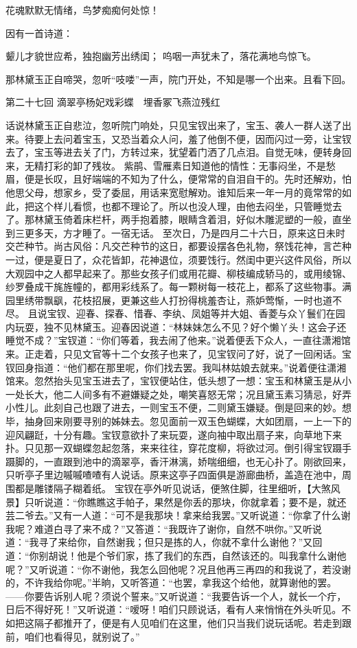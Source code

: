 \documentclass[12pt,oneside]{book}
\begin{document}
花魂默默无情绪，鸟梦痴痴何处惊！

因有一首诗道：

颦儿才貌世应希，独抱幽芳出绣闺；
呜咽一声犹未了，落花满地鸟惊飞。

那林黛玉正自啼哭，忽听“吱喽”一声，院门开处，不知是哪一个出来。且看下回。




 
第二十七回  滴翠亭杨妃戏彩蝶　埋香冢飞燕泣残红


话说林黛玉正自悲泣，忽听院门响处，只见宝钗出来了，宝玉、袭人一群人送了出来。待要上去问着宝玉，又恐当着众人问，羞了他倒不便，因而闪过一旁，让宝钗去了，宝玉等进去关了门，方转过来，犹望着门洒了几点泪。自觉无味，便转身回来，无精打彩的卸了残妆。
紫鹃、雪雁素日知道他的情性：无事闷坐，不是愁眉，便是长叹，且好端端的不知为了什么，便常常的自泪自干的。先时还解劝，怕他思父母，想家乡，受了委屈，用话来宽慰解劝。谁知后来一年一月的竟常常的如此，把这个样儿看惯，也都不理论了。所以也没人理，由他去闷坐，只管睡觉去了。那林黛玉倚着床栏杆，两手抱着膝，眼睛含着泪，好似木雕泥塑的一般，直坐到三更多天，方才睡了。一宿无话。
至次日，乃是四月二十六日，原来这日未时交芒种节。尚古风俗：凡交芒种节的这日，都要设摆各色礼物，祭饯花神，言芒种一过，便是夏日了，众花皆卸，花神退位，须要饯行。然闺中更兴这件风俗，所以大观园中之人都早起来了。那些女孩子们或用花瓣、柳枝编成轿马的，或用绫锦、纱罗叠成干旄旌幢的，都用彩线系了。每一颗树每一枝花上，都系了这些物事。满园里绣带飘飖，花枝招展，更兼这些人打扮得桃羞杏让，燕妒莺惭，一时也道不尽。
且说宝钗、迎春、探春、惜春、李纨、凤姐等并大姐、香菱与众丫鬟们在园内玩耍，独不见林黛玉。迎春因说道：“林妹妹怎么不见？好个懒丫头！这会子还睡觉不成？”宝钗道：“你们等着，我去闹了他来。”说着便丢下众人，一直往潇湘馆来。正走着，只见文官等十二个女孩子也来了，见宝钗问了好，说了一回闲话。宝钗回身指道：“他们都在那里呢，你们找去罢。我叫林姑娘去就来。”说着便往潇湘馆来。忽然抬头见宝玉进去了，宝钗便站住，低头想了一想：宝玉和林黛玉是从小一处长大，他二人间多有不避嫌疑之处，嘲笑喜怒无常；况且黛玉素习猜忌，好弄小性儿。此刻自己也跟了进去，一则宝玉不便，二则黛玉嫌疑。倒是回来的妙。想毕，抽身回来刚要寻别的姊妹去。忽见面前一双玉色蝴蝶，大如团扇，一上一下的迎风翩跹，十分有趣。宝钗意欲扑了来玩耍，遂向袖中取出扇子来，向草地下来扑。只见那一双蝴蝶忽起忽落，来来往往，穿花度柳，将欲过河。倒引得宝钗蹑手蹑脚的，一直跟到池中的滴翠亭，香汗淋漓，娇喘细细，也无心扑了。刚欲回来，只听亭子里边嘁嘁喳喳有人说话。原来这亭子四面俱是游廊曲桥，盖造在池中，周围都是雕镂隔子糊着纸。
宝钗在亭外听见说话，便煞住脚，往里细听，【大煞风景】只听说道：“你瞧瞧这手帕子，果然是你丢的那块，你就拿着；要不是，就还芸二爷去。”又有一人道：“可不是我那块！拿来给我罢。”又听说道：“你拿了什么谢我呢？难道白寻了来不成？”又答道：“我既许了谢你，自然不哄你。”又听说道：“我寻了来给你，自然谢我；但只是拣的人，你就不拿什么谢他？”又回道：“你别胡说！他是个爷们家，拣了我们的东西，自然该还的。叫我拿什么谢他呢？”又听说道：“你不谢他，我怎么回他呢？况且他再三再四的和我说了，若没谢的，不许我给你呢。”半晌，又听答道：“也罢，拿我这个给他，就算谢他的罢。——你要告诉别人呢？须说个誓来。”又听说道：“我要告诉一个人，就长一个疔，日后不得好死！”又听说道：“嗳呀！咱们只顾说话，看有人来悄悄在外头听见。不如把这隔子都推开了，便是有人见咱们在这里，他们只当我们说玩话呢。若走到跟前，咱们也看得见，就别说了。”
\end{document}
